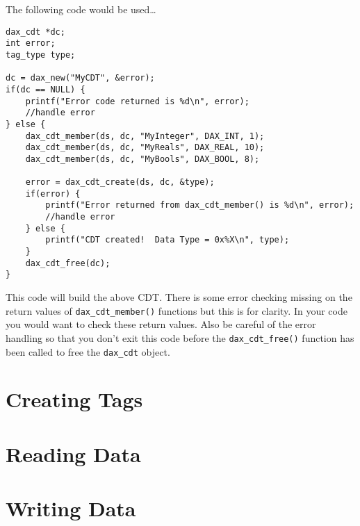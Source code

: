 The following code would be used\ldots
\begin{verbatim}
dax_cdt *dc;
int error;
tag_type type;

dc = dax_new("MyCDT", &error);
if(dc == NULL) {
    printf("Error code returned is %d\n", error);
    //handle error
} else {
    dax_cdt_member(ds, dc, "MyInteger", DAX_INT, 1);
    dax_cdt_member(ds, dc, "MyReals", DAX_REAL, 10);
    dax_cdt_member(ds, dc, "MyBools", DAX_BOOL, 8);

    error = dax_cdt_create(ds, dc, &type);
    if(error) {
        printf("Error returned from dax_cdt_member() is %d\n", error);
	    //handle error
    } else {
        printf("CDT created!  Data Type = 0x%X\n", type);
    }
    dax_cdt_free(dc);
}

\end{verbatim}

This code will build the above CDT.  There is some error checking missing on the return values of \verb|dax_cdt_member()| functions but this is for clarity.  In your code you would want to check these return values.  Also be careful of the error handling so that you don't exit this code before the \verb|dax_cdt_free()| function has been called to free the \verb|dax_cdt| object.

\section{Creating Tags}

\section{Reading Data}

\section{Writing Data}
